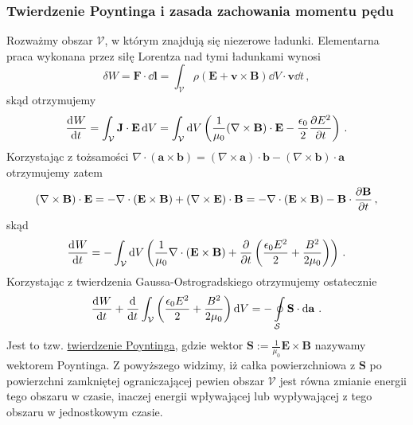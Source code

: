 \documentclass[../main.tex]{subfiles}
\begin{document}
\subsubsection{Twierdzenie Poyntinga i zasada zachowania momentu pędu}
Rozważmy obszar \(\mathcal{V}\), w którym znajdują się niezerowe ładunki. Elementarna praca wykonana
przez siłę Lorentza nad tymi ładunkami wynosi
\begin{equation*}
    \delta W=\mathbf{F}\cdot\dd{\mathbf{l}}=\int_\mathcal{V}\rho(\mathbf{E}+\mathbf{v}\times\mathbf{B})\dd{V}\cdot\mathbf{v}\dd{t}\,,
\end{equation*}
skąd otrzymujemy
\begin{equation*}
    \dv[]{W}{t}=\int_\mathcal{V}\mathbf{J}\cdot\mathbf{E}\dd{V}=\int_\mathcal{V}\dd{V}\left(\frac{1}{\mu_0}(\nabla\times\mathbf{B})\cdot\mathbf{E}-\frac{\epsilon_0}{2}\pdv{E^2}{t}\right)\,.
\end{equation*}
Korzystając z tożsamości
\(\nabla\cdot(\mathbf{a}\times\mathbf{b})=(\nabla\times\mathbf{a})\cdot\mathbf{b}-(\nabla\times\mathbf{b})\cdot\mathbf{a}\)
otrzymujemy zatem
\begin{equation*}
    (\nabla\times\mathbf{B})\cdot\mathbf{E}=-\nabla\cdot(\mathbf{E}\times\mathbf{B})+(\nabla\times\mathbf{E})\cdot\mathbf{B}=-\nabla\cdot(\mathbf{E}\times\mathbf{B})-\mathbf{B}\cdot\pdv{\mathbf{B}}{t}\,,
\end{equation*}
skąd
\begin{equation*}
    \dv[]{W}{t}=-\int_\mathcal{V}\dd{V}\left(\frac{1}{\mu_0}\nabla\cdot(\mathbf{E}\times\mathbf{B})+\pdv{}{t}\left(\frac{\epsilon_0E^2}{2}+\frac{B^2}{2\mu_0}\right)\right)\,.
\end{equation*}
Korzystając z twierdzenia Gaussa-Ostrogradskiego otrzymujemy ostatecznie
\begin{equation*}
    \dv[]{W}{t}+\dv[]{}{t}\int_\mathcal{V}\left(\frac{\epsilon_0E^2}{2}+\frac{B^2}{2\mu_0}\right)\dd{V}=-\oint\limits_\mathcal{S}\mathbf{S}\cdot\dd{\mathbf{a}}\,.
\end{equation*}
Jest to tzw. \underline{twierdzenie Poyntinga}, gdzie wektor
\(\mathbf{S}:=\frac{1}{\mu_0}\mathbf{E}\times\mathbf{B}\) nazywamy wektorem Poyntinga. Z powyższego
widzimy, iż całka powierzchniowa z \(\mathbf{S}\) po powierzchni zamkniętej ograniczającej pewien
obszar \(\mathcal{V}\) jest równa zmianie energii tego obszaru w czasie, inaczej energii wpływającej
lub wypływającej z tego obszaru w jednostkowym czasie.
\end{document}
